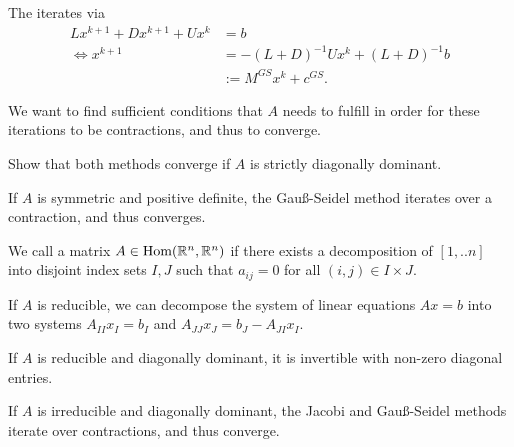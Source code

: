 The  iterates via
\begin{align*}
	Lx^{k+1} + Dx^{k+1} + Ux^k &= b\\
	\Leftrightarrow x^{k+1} &= -(L+D)^{-1}Ux^k + (L+D)^{-1}b\\
	&:=M^{GS}x^k + c^{GS}.
\end{align*}

We want to find sufficient conditions that $A$ needs to fulfill in order for these iterations to be contractions, and thus to converge.
\begin{exercise}
	Show that both methods converge if $A$ is strictly diagonally dominant.
\end{exercise}
\begin{theorem}
	If $A$ is symmetric and positive definite, the Gauß-Seidel method iterates over a contraction, and thus converges.
\end{theorem}
\begin{definition}
	We call a matrix $A \in \textnormal{Hom}(\mathbb{R}^n, \mathbb{R}^n)$  if there exists a decomposition of $[1,..n]$ into disjoint index sets $I,J$ such that $a_{ij} = 0$ for all $(i,j) \in I \times J$.
\end{definition}
\begin{theorem}
	If $A$ is reducible, we can decompose the system of linear equations $Ax = b$ into two systems $A_{II}x_I = b_I$ and $A_{JJ}x_J = b_J - A_{JI}x_I$.
\end{theorem}
\begin{theorem}
	If $A$ is reducible and diagonally dominant, it is invertible with non-zero diagonal entries.
\end{theorem}
\begin{theorem}
	If $A$ is irreducible and diagonally dominant, the Jacobi and Gauß-Seidel methods iterate over contractions, and thus converge.
\end{theorem}